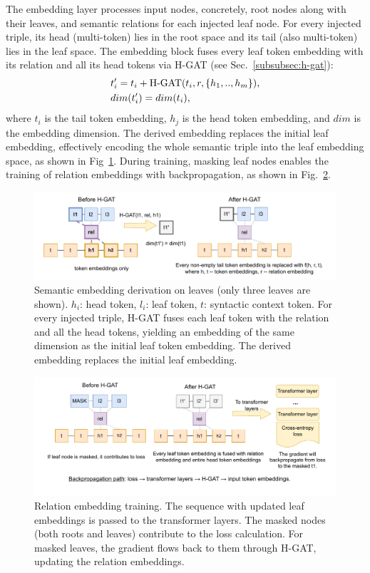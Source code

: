 \documentclass[10pt]{article}
\begin{document}
The embedding layer processes input nodes, concretely, root nodes along with their leaves, and semantic relations for each injected leaf node. For every injected triple, its head (multi-token) lies in the root space and its tail (also multi-token) lies in the leaf space. The embedding block fuses every leaf token embedding with its relation and all its head tokens via H-GAT (see Sec.~\ref{subsubsec:h-gat}):    
\begin{align}
& t'_i = t_i + \text{H-GAT}(t_i, r, \{h_1, .., h_m\}),\\
& dim(t'_i) = dim(t_i), \notag
\end{align}
where $t_i$ is the tail token embedding, $h_j$ is the head token embedding, and $dim$ is the embedding dimension.
The derived embedding replaces the initial leaf embedding, effectively encoding the whole semantic triple into the leaf embedding space, as shown in Fig~\ref{fig:h-gat}. During training, masking leaf nodes enables the training of relation embeddings with backpropagation, as shown in Fig.~\ref{fig:backprop}.

\begin{figure}[t]
\centering
\includegraphics[width=0.9\linewidth]{pictures/h-gat.pdf}
\caption{Semantic embedding derivation on leaves (only three leaves are shown). $h_i$: head token, $l_i$: leaf token, $t$: syntactic context token. For every injected triple, H-GAT fuses each leaf token with the relation and all the head tokens, yielding an embedding of the same dimension as the initial leaf token embedding. The derived embedding replaces the initial leaf embedding.}
\label{fig:h-gat}
\end{figure}

\begin{figure}[t!]
\centering
\includegraphics[width=\linewidth]{pictures/backprop.pdf}
\caption{Relation embedding training. The sequence with updated leaf embeddings is passed to the transformer layers. The masked nodes (both roots and leaves) contribute to the loss calculation. For masked leaves, the gradient flows back to them through H-GAT, updating the relation embeddings.}
\label{fig:backprop}
\end{figure}
\end{document}
